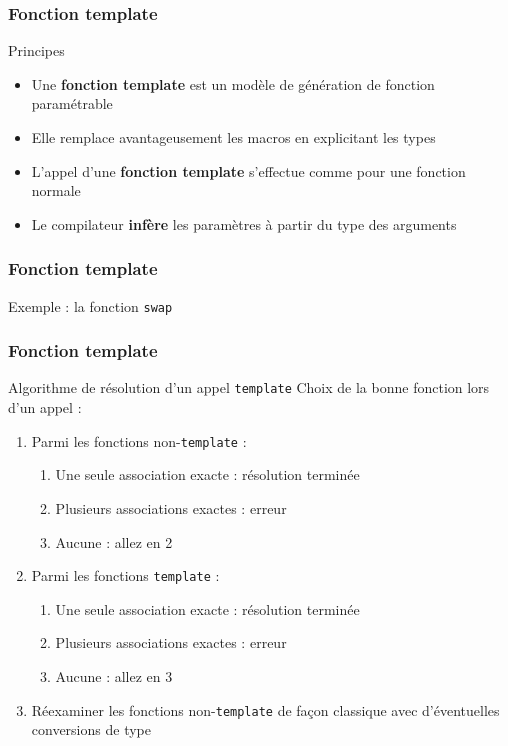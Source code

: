 \documentclass[svgnames]{beamer}
\begin{document}
\frame
{
  \frametitle{Fonction template}
  \begin{block}{Principes}
  \begin{itemize}
  \footnotesize
  \item Une \textbf{fonction template} est un modèle de génération de fonction paramétrable
  \item Elle remplace avantageusement les macros en explicitant les types
  \bigskip
  \lsttmpfunction
  \item L'appel d'une \textbf{fonction template} s'effectue comme pour une fonction normale
  \item Le compilateur \textbf{infère} les paramètres à partir du type des arguments
  \bigskip
  \lsttmpfunctioncall
  \end{itemize}
  \end{block}
}

\frame
{
  \frametitle{Fonction template}
  \begin{block}{Exemple : la fonction \texttt{swap}}
  \begin{overlayarea}{\textwidth}{5cm}
  \end{overlayarea}
  \end{block}
}


\frame
{
  \frametitle{Fonction template}
  \begin{block}{Algorithme de résolution d'un appel \texttt{template}}
  \footnotesize Choix de la bonne fonction lors d'un appel :
  \begin{enumerate}
  \footnotesize
  \item Parmi les fonctions non-\texttt{template} :
  \begin{enumerate}
  \footnotesize
  \item Une seule association exacte : \alert{résolution terminée}
  \item Plusieurs associations exactes : \alert{erreur}
  \item Aucune : \alert{allez en 2}
  \end{enumerate}
  \item Parmi les fonctions \texttt{template} :
  \begin{enumerate}
  \footnotesize
  \item Une seule association exacte : \alert{résolution terminée}
  \item Plusieurs associations exactes : \alert{erreur}
  \item Aucune : \alert{allez en 3}
  \end{enumerate}
  \item Réexaminer les fonctions non-\texttt{template} de façon classique
    avec d'éventuelles conversions de type
 \end{enumerate}
 \end{block}
}
\end{document}
